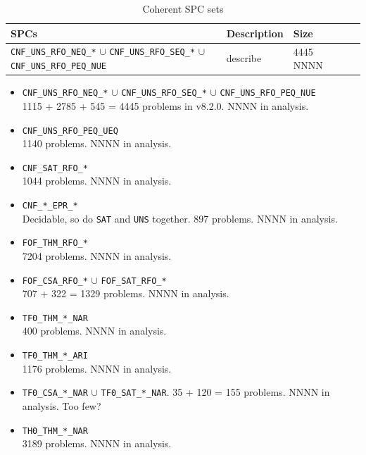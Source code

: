 \documentclass[runningheads]{llncs}
\begin{document}
\begin{table}[tbh]
\begin{tabularx}{\textwidth}{lX|lX|r}
\hline
SPCs & Description & Size \\
\hline
{\tt CNF\_UNS\_RFO\_NEQ\_*} $\cup$ \newline
{\tt CNF\_UNS\_RFO\_SEQ\_*} $\cup$ \newline
{\tt CNF\_UNS\_RFO\_PEQ\_NUE} &
describe 
& 4445 \newline
NNNN \\
\hline
\end{tabularx}
\caption{Coherent SPC sets}
\label{SPCSets}
\end{table}
      \begin{itemize}
      \item {\tt CNF\_UNS\_RFO\_NEQ\_*} $\cup$ {\tt CNF\_UNS\_RFO\_SEQ\_*} $\cup$ 
            {\tt CNF\_UNS\_RFO\_PEQ\_NUE} \\
            1115 + 2785 + 545 = 4445 problems in v8.2.0. NNNN in analysis.
      \item {\tt CNF\_UNS\_RFO\_PEQ\_UEQ} \\
            1140 problems. NNNN in analysis.
      \item {\tt CNF\_SAT\_RFO\_*} \\
            1044 problems. NNNN in analysis.
      \item {\tt CNF\_*\_EPR\_*} \\ 
            Decidable, so do {\tt SAT} and {\tt UNS} together.
            897 problems. NNNN in analysis.
      \item {\tt FOF\_THM\_RFO\_*} \\
            7204 problems. NNNN in analysis.
      \item {\tt FOF\_CSA\_RFO\_*} $\cup$ {\tt FOF\_SAT\_RFO\_*} \\
            707 + 322 = 1329 problems. NNNN in analysis.
      \item {\tt TF0\_THM\_*\_NAR} \\
            400 problems. NNNN in analysis.
      \item {\tt TF0\_THM\_*\_ARI} \\
            1176 problems. NNNN in analysis.
      \item {\tt TF0\_CSA\_*\_NAR} $\cup$ {\tt TF0\_SAT\_*\_NAR}. 
            35 + 120 = 155 problems. NNNN in analysis.
            Too few?
      \item {\tt TH0\_THM\_*\_NAR} \\
            3189 problems. NNNN in analysis.
      \end{itemize}
\end{document}
